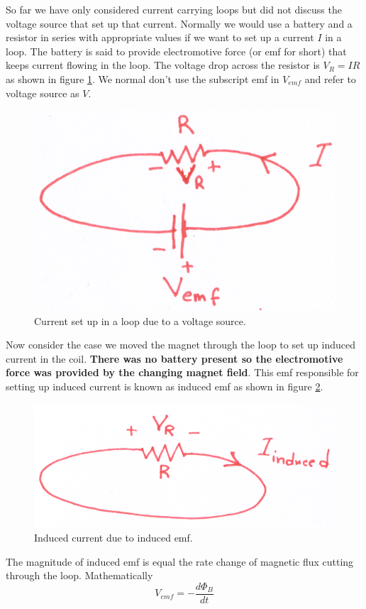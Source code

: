 \documentclass[12pt,a4paper]{article}
\begin{document}
So far we have only considered current carrying loops but did not discuss the voltage source that set up that current. Normally we would use a battery and a resistor in series with appropriate values if we want to set up a current $I$ in a loop. The battery is said to provide electromotive force (or emf for short) that keeps current flowing in the loop. The voltage drop across the resistor is $V_R=IR$ as shown in figure \ref{Current-Battery}. We normal don't use the subscript emf in $V_{emf}$ and refer to voltage source as $V$.
\begin{figure}[H]
\centering
\includegraphics[scale=0.5]{CurrentBattery.png}
\caption{Current set up in a loop due to a voltage source.}
\label{Current-Battery}
\end{figure}
\newpage
Now consider the case we moved the magnet through the loop to set up induced current in the coil. \textbf{There was no battery present so the electromotive force was provided by the changing magnet field}. This emf responsible for setting up induced current is known as induced emf as shown in figure \ref{Induced-emf}.
\begin{figure}[H]
\centering
\includegraphics[scale=0.5]{InducedEMF.png}
\caption{Induced current due to induced emf.}
\label{Induced-emf}
\end{figure}
The magnitude of induced emf is equal the rate change of magnetic flux cutting through the loop. Mathematically
\begin{equation}
V_{emf}=-\dfrac{d\Phi_B}{dt}
\end{equation}
\end{document}
